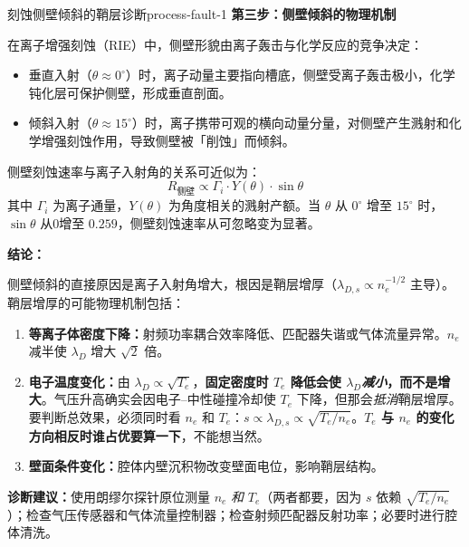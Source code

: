 \documentclass[12pt,a4paper,openany,oneside]{book}
\begin{document}
\begin{example}{刻蚀侧壁倾斜的鞘层诊断}{process-fault-1}
\textbf{第三步：侧壁倾斜的物理机制}

在离子增强刻蚀（RIE）中，侧壁形貌由离子轰击与化学反应的竞争决定：
\begin{itemize}
    \item 垂直入射（$\theta \approx 0^\circ$）时，离子动量主要指向槽底，侧壁受离子轰击极小，化学钝化层可保护侧壁，形成垂直剖面。
    \item 倾斜入射（$\theta \approx 15^\circ$）时，离子携带可观的横向动量分量，对侧壁产生溅射和化学增强刻蚀作用，导致侧壁被「削蚀」而倾斜。
\end{itemize}

侧壁刻蚀速率与离子入射角的关系可近似为：
\[
R_{\text{侧壁}} \propto \Gamma_i \cdot Y(\theta) \cdot \sin\theta
\]
其中 $\Gamma_i$ 为离子通量，$Y(\theta)$ 为角度相关的溅射产额。当 $\theta$ 从 $0^\circ$ 增至 $15^\circ$ 时，$\sin\theta$ 从0增至 $0.259$，侧壁刻蚀速率从可忽略变为显著。

\textbf{结论：}

侧壁倾斜的直接原因是离子入射角增大，根因是鞘层增厚（$\lambda_{D,s}\propto n_e^{-1/2}$ 主导）。鞘层增厚的可能物理机制包括：
\begin{enumerate}
    \item \textbf{等离子体密度下降：}射频功率耦合效率降低、匹配器失谐或气体流量异常。$n_e$ 减半使 $\lambda_D$ 增大 $\sqrt2$ 倍。
    \item \textbf{电子温度变化：}由 $\lambda_D\propto\sqrt{T_e}$，\textbf{固定密度时 $T_e$ 降低会使 $\lambda_D$\emph{减小}，而不是增大}。气压升高确实会因电子--中性碰撞冷却使 $T_e$ 下降，但那会\emph{抵消}鞘层增厚。要判断总效果，必须同时看 $n_e$ 和 $T_e$：$s\propto\lambda_{D,s}\propto\sqrt{T_e/n_e}$。\textbf{$T_e$ 与 $n_e$ 的变化方向相反时谁占优要算一下}，不能想当然。
    \item \textbf{壁面条件变化：}腔体内壁沉积物改变壁面电位，影响鞘层结构。
\end{enumerate}

\textbf{诊断建议：}使用朗缪尔探针原位测量 $n_e$ \emph{和} $T_e$（两者都要，因为 $s$ 依赖 $\sqrt{T_e/n_e}$）；检查气压传感器和气体流量控制器；检查射频匹配器反射功率；必要时进行腔体清洗。
\end{example}
\end{document}
